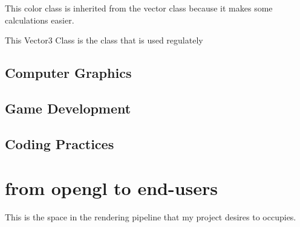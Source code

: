            This color class is inherited from the vector class because it makes some calculations easier.


            This Vector3 Class is the class that is used regulately

        \subsection{Computer Graphics}
        \subsection{Game Development}
        \subsection{Coding Practices}

    \section{from opengl to end-users}
        This is the space in the rendering pipeline that my project desires to occupies. 







